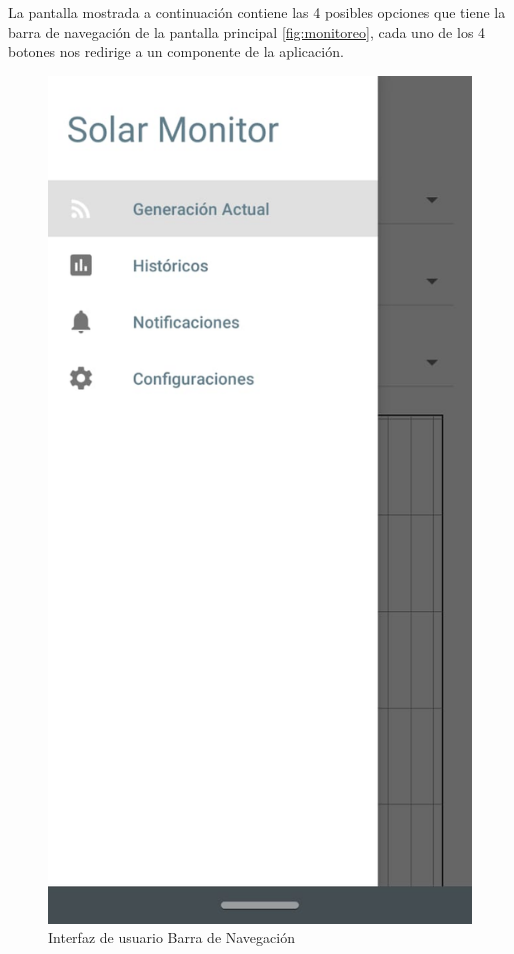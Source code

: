 La pantalla mostrada a continuación contiene las 4 posibles opciones que tiene la barra de navegación de la pantalla principal \ref{fig:monitoreo}, cada uno de los 4 botones nos redirige a un componente de la aplicación.

\begin{figure}[H]
	\centering
	\includegraphics[scale=0.4]{Capitulo4/software/submodulos/images/man2.png}
	\caption{Interfaz de usuario Barra de Navegación}
	\label{fig:Barra de navegacion}
\end{figure}

